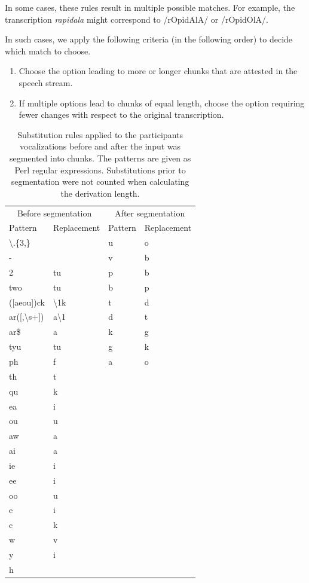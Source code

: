 \documentclass[
]{article}
\providecommand{\tightlist}{%
  \setlength{\itemsep}{0pt}\setlength{\parskip}{0pt}}
\begin{document}
In some cases, these rules result in multiple possible matches. For
example, the transcription \emph{rapidala} might correspond to
/rOpidAlA/ or /rOpidOlA/.

In such cases, we apply the following criteria (in the following order)
to decide which match to choose.

\begin{enumerate}
\def\labelenumi{\arabic{enumi}.}
\tightlist
\item
  Choose the option leading to more or longer chunks that are attested
  in the speech stream.
\item
  If multiple options lead to chunks of equal length, choose the option
  requiring fewer changes with respect to the original transcription.
\end{enumerate}

\begin{table}

\caption{\label{tab:recall-print-substitution-rules}Substitution rules applied to the participants vocalizations before and after the input was segmented into chunks. The patterns are given as Perl regular expressions. Substitutions prior to segmentation were not counted when calculating the derivation length.}
\centering
\begin{tabular}[t]{llll}
\toprule
\multicolumn{2}{c}{Before segmentation} & \multicolumn{2}{c}{After segmentation} \\
\cmidrule(l{3pt}r{3pt}){1-2} \cmidrule(l{3pt}r{3pt}){3-4}
Pattern & Replacement & Pattern & Replacement\\
\midrule
\textbackslash{}.\{3,\} &  & u & o\\
- &  & v & b\\
2 & tu & p & b\\
two & tu & b & p\\
([aeou])ck & \textbackslash{}1k & t & d\\
\addlinespace
ar([,\textbackslash{}s+]) & a\textbackslash{}1 & d & t\\
ar\$ & a & k & g\\
tyu & tu & g & k\\
ph & f & a & o\\
th & t &  & \\
\addlinespace
qu & k &  & \\
ea & i &  & \\
ou & u &  & \\
aw & a &  & \\
ai & a &  & \\
\addlinespace
ie & i &  & \\
ee & i &  & \\
oo & u &  & \\
e & i &  & \\
c & k &  & \\
\addlinespace
w & v &  & \\
y & i &  & \\
h &  &  & \\
\bottomrule
\end{tabular}
\end{table}
\end{document}
